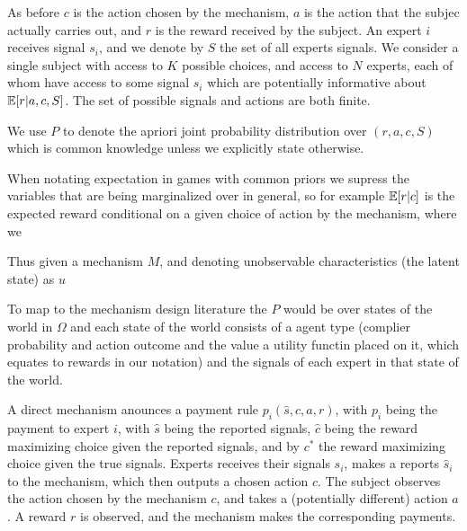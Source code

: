 As before $c$ is the action chosen by the mechanism, $a$ is the action that the subjec actually carries out, and $r$ is the reward received by the subject. An expert $i$ receives signal $s_i$, and we denote by $S$ the set of all experts signals.
We consider a single subject with access to $K$ possible choices, and access to  $N$ experts, each of whom have access to some signal $s_i$ which are potentially informative about $\operatorname*{\mathbb E}[r|a,c,S]$. The set of possible signals and actions are both finite.


We use $P$ to denote the apriori joint probability distribution over $(r,a,c,S) $ which is common knowledge unless we explicitly state otherwise.  

When notating expectation in games with common priors we supress the variables that are being marginalized over in general, so for example $\operatorname*{\mathbb E}[r|c]$ is the expected reward conditional on a given choice of action by the mechanism, where we  

Thus given a mechanism $M$, and denoting unobservable characteristics (the latent state) as $u$



%	


To map to the mechanism design literature the $P$ would be over states of the world in $\Omega$ and each state of the world consists of a agent type (complier probability and action outcome and the value a utility functin placed on it, which equates to rewards in our notation) and the signals of each expert in that state of the world.

A direct mechanism anounces a payment rule $p_i(\hat{s}, c,a,r)$, with $p_i$ being the payment to expert $i$, with $\hat{s}$ being the reported signals, $\hat{c}$ being the reward maximizing choice given the reported signals, and by $c^{*}$ the reward maximizing choice given the true signals.
Experts receives their signals $s_i$, makes a reports $\hat{s}_i$ to the mechanism, which then outputs a chosen action $c$.
The subject observes the action chosen by the mechanism $c$, and takes a (potentially different) action $a$. A reward $r$ is observed, and the mechanism makes the corresponding payments.

